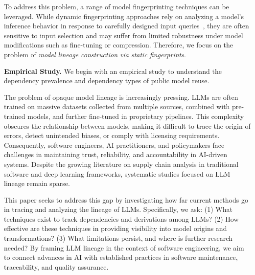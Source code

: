 To address this problem, a range of model fingerprinting techniques can be leveraged. While dynamic fingerprinting approaches rely on analyzing a model's inference behavior in response to carefully designed input queries~\cite{guan2022you, peng2022fingerprinting, yang2022metafinger, pasquini2025llmmap, oyama2025mapping, wu2025llm, gubri2024trap, yamabe2025mergeprint, xu2026dnf, zhang2024reef, wu2025tensorguard, xu2025delta}, they are often sensitive to input selection and may suffer from limited robustness under model modifications such as fine-tuning or compression. Therefore, we focus on the problem of \textit{model lineage construction via static fingerprints}. 

\textbf{Empirical Study.} We begin with an empirical study to understand the dependency prevalence and dependency types of public model reuse.


The problem of opaque model lineage is increasingly pressing. LLMs are often trained on massive datasets collected from multiple sources, combined with pre-trained models, and further fine-tuned in proprietary pipelines. This complexity obscures the relationship between models, making it difficult to trace the origin of errors, detect unintended biases, or comply with licensing requirements. Consequently, software engineers, AI practitioners, and policymakers face challenges in maintaining trust, reliability, and accountability in AI-driven systems. Despite the growing literature on supply chain analysis in traditional software and deep learning frameworks, systematic studies focused on LLM lineage remain sparse.

This paper seeks to address this gap by investigating how far current methods go in tracing and analyzing the lineage of LLMs. Specifically, we ask: (1) What techniques exist to track dependencies and derivations among LLMs? (2) How effective are these techniques in providing visibility into model origins and transformations? (3) What limitations persist, and where is further research needed? By framing LLM lineage in the context of software engineering, we aim to connect advances in AI with established practices in software maintenance, traceability, and quality assurance.
